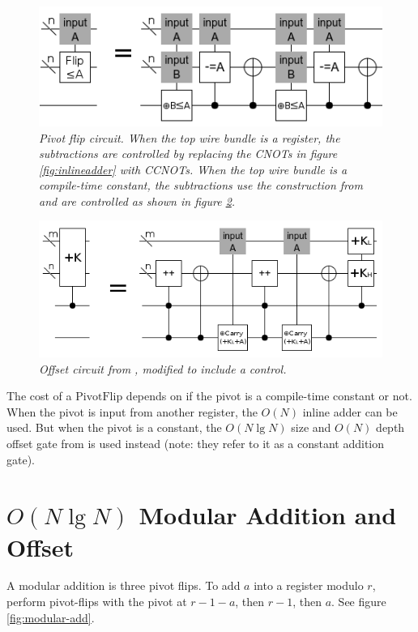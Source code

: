 \documentclass[twocolumn]{article}
\begin{document}
\begin{figure}
  \centering
  \includegraphics[totalheight=2.7cm]{pivot-flip.png}
  \caption{\em Pivot flip circuit.
  When the top wire bundle is a register, the subtractions are controlled by replacing the CNOTs in figure \ref{fig:inlineadder} with CCNOTs.
  When the top wire bundle is a compile-time constant, the subtractions use the construction from \cite{haner2016} and are controlled as shown in figure \ref{fig:controlled-offset}.}
  \label{fig:const-pivot-flip}
\end{figure}

\begin{figure}
  \centering
  \includegraphics[totalheight=3.1cm]{controlled-offset.png}
  \caption{\em Offset circuit from \cite{haner2016}, modified to include a control.}
  \label{fig:controlled-offset}
\end{figure}

The cost of a $\text{PivotFlip}$ depends on if the pivot is a compile-time constant or not.
When the pivot is input from another register, the $O(N)$ inline adder can be used.
But when the pivot is a constant, the $O(N \lg N)$ size and $O(N)$ depth offset gate from \cite{haner2016} is used instead (note: they refer to it as a constant addition gate).

\section{$O(N \lg N)$ Modular Addition and Offset}

A modular addition is three pivot flips.
To add $a$ into a register modulo $r$, perform pivot-flips with the pivot at $r-1-a$, then $r-1$, then $a$.
See figure \ref{fig:modular-add}.
\end{document}
